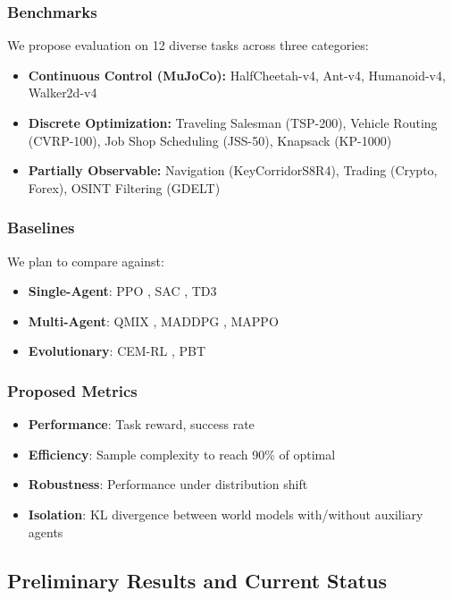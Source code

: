 \documentclass[12pt, a4paper]{article}
\begin{document}
\subsubsection{Benchmarks}
We propose evaluation on 12 diverse tasks across three categories:

\begin{itemize}
    \item \textbf{Continuous Control (MuJoCo):} HalfCheetah-v4, Ant-v4, Humanoid-v4, Walker2d-v4
    \item \textbf{Discrete Optimization:} Traveling Salesman (TSP-200), Vehicle Routing (CVRP-100), Job Shop Scheduling (JSS-50), Knapsack (KP-1000)
    \item \textbf{Partially Observable:} Navigation (KeyCorridorS8R4), Trading (Crypto, Forex), OSINT Filtering (GDELT)
\end{itemize}

\subsubsection{Baselines}
We plan to compare against:
\begin{itemize}
	\item \textbf{Single-Agent}: PPO \cite{schulman2017proximal}, SAC \cite{haarnoja2018soft}, TD3 \cite{fujimoto2018addressing}
	\item \textbf{Multi-Agent}: QMIX \cite{rashid2018qmix}, MADDPG \cite{lowe2017multi}, MAPPO \cite{yu2022surprising}
	\item \textbf{Evolutionary}: CEM-RL \cite{pourchot2018cem}, PBT \cite{jaderberg2017population} 
\end{itemize}

\subsubsection{Proposed Metrics}
\begin{itemize}
	\item \textbf{Performance}: Task reward, success rate
	\item \textbf{Efficiency}: Sample complexity to reach 90\% of optimal
	\item \textbf{Robustness}: Performance under distribution shift
	\item \textbf{Isolation}: KL divergence between world models with/without auxiliary agents
\end{itemize}

\subsection{Preliminary Results and Current Status}
\end{document}
